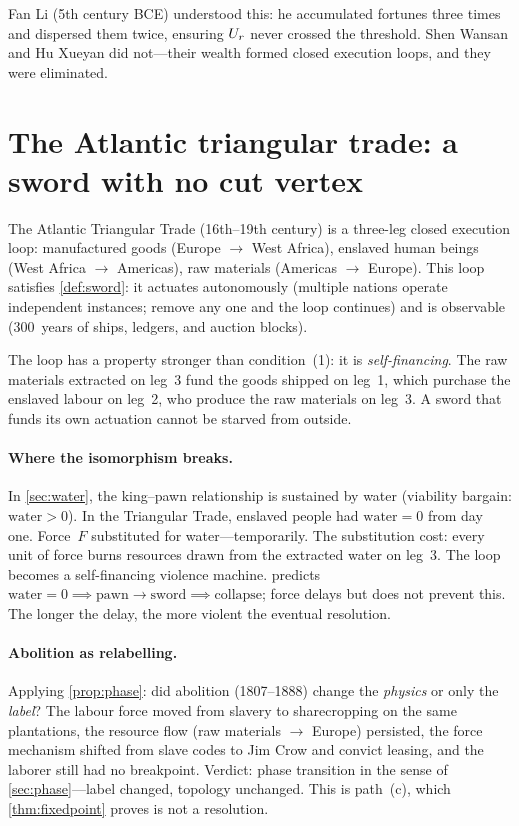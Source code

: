 Fan Li (5th century BCE) understood this: he accumulated fortunes
three times and dispersed them twice, ensuring $U_r$ never crossed
the threshold. Shen Wansan and Hu Xueyan did not---their wealth
formed closed execution loops, and they were eliminated.

\section{The Atlantic triangular trade: a sword with no cut
vertex}\label{sec:triangle}

The Atlantic Triangular Trade (16th--19th century) is a three-leg
closed execution loop: manufactured goods (Europe $\to$ West Africa),
enslaved human beings (West Africa $\to$ Americas), raw materials
(Americas $\to$ Europe). This loop satisfies \cref{def:sword}: it
actuates autonomously (multiple nations operate independent instances;
remove any one and the loop continues) and is observable (300~years of
ships, ledgers, and auction blocks).

The loop has a property stronger than condition~(1): it is
\emph{self-financing}. The raw materials extracted on leg~3 fund the
goods shipped on leg~1, which purchase the enslaved labour on leg~2,
who produce the raw materials on leg~3. A sword that funds its own
actuation cannot be starved from outside.

\paragraph{Where the isomorphism breaks.}
In \cref{sec:water}, the king--pawn relationship is sustained by water
(viability bargain: $\text{water} > 0$). In the Triangular Trade,
enslaved people had $\text{water} = 0$ from day one. Force~$F$
substituted for water---temporarily. The substitution cost: every unit
of force burns resources drawn from the extracted water on leg~3. The
loop becomes a self-financing violence machine. 
predicts $\text{water} = 0 \implies \text{pawn} \to \text{sword}
\implies \text{collapse}$; force delays but does not prevent this.
The longer the delay, the more violent the eventual resolution.

\paragraph{Abolition as relabelling.}
Applying \cref{prop:phase}: did abolition (1807--1888) change the
\emph{physics} or only the \emph{label}? The labour force moved from
slavery to sharecropping on the same plantations, the resource flow
(raw materials $\to$ Europe) persisted, the force mechanism shifted
from slave codes to Jim Crow and convict leasing, and the laborer
still had no breakpoint. Verdict: phase transition in the sense of
\cref{sec:phase}---label changed, topology unchanged. This is
path~(c), which \cref{thm:fixedpoint} proves is not a resolution.


